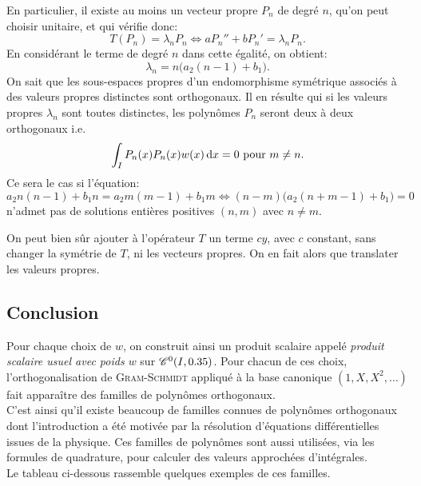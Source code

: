En particulier, il existe au moins un vecteur propre $P_n$ de degré $n$, qu'on peut choisir unitaire, et qui vérifie donc:
$$T(P_n) = \lambda_n P_n \Longleftrightarrow a P_n'' + b P_n' = \lambda_n P_n.$$
En considérant le terme de degré $n$ dans cette égalité, on obtient:
$$\lambda_n = n \big( a_2(n-1) + b_1 \big).$$
On sait que les sous-espaces propres d'un endomorphisme symétrique associés à des valeurs propres distinctes sont orthogonaux. Il en résulte qui si les valeurs propres $\lambda_n$ sont toutes distinctes, les polynômes $P_n$ seront deux à deux orthogonaux i.e.
$$\int_I P_n(x) P_n(x) w(x) \, \mathrm{d} x = 0 \text{ pour } m \not= n.$$
Ce sera le cas si l'équation:
$$a_2 n (n-1) + b_1 n = a_2 m (m-1) + b_1 m \Longleftrightarrow (n-m) \big( a_2 (n+m-1) + b_1 \big) = 0$$
n'admet pas de solutions entières positives $(n, m)$ avec $n \not= m$.

\begin{remarque}
    On peut bien sûr ajouter à l'opérateur $T$ un terme $cy$, avec $c$ constant, sans changer la symétrie de $T$, ni les vecteurs propres. On en fait alors que translater les valeurs propres.
\end{remarque}

\subsection{Conclusion}

Pour chaque choix de $w$, on construit ainsi un produit scalaire appelé \emph{produit scalaire usuel avec poids $w$} sur $\mathscr{C}^0(I, 0.35)$. Pour chacun de ces choix, l'orthogonalisation de \textsc{Gram}-\textsc{Schmidt} appliqué à la base canonique $(1, X, X^2, \dots)$ fait apparaître des familles de polynômes orthogonaux. \\
C'est ainsi qu'il existe beaucoup de familles connues de polynômes orthogonaux dont l'introduction a été motivée par la résolution d'équations différentielles issues de la physique. Ces familles de polynômes sont aussi utilisées, via les formules de quadrature, pour calculer des valeurs approchées d'intégrales. \\
Le tableau ci-dessous rassemble quelques exemples de ces familles. 

